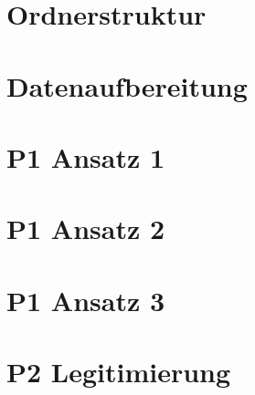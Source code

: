 
\section{Ordnerstruktur}

\section{Datenaufbereitung}

\section{P1 Ansatz 1}

\section{P1 Ansatz 2}

\section{P1 Ansatz 3}

\section{P2 Legitimierung}
